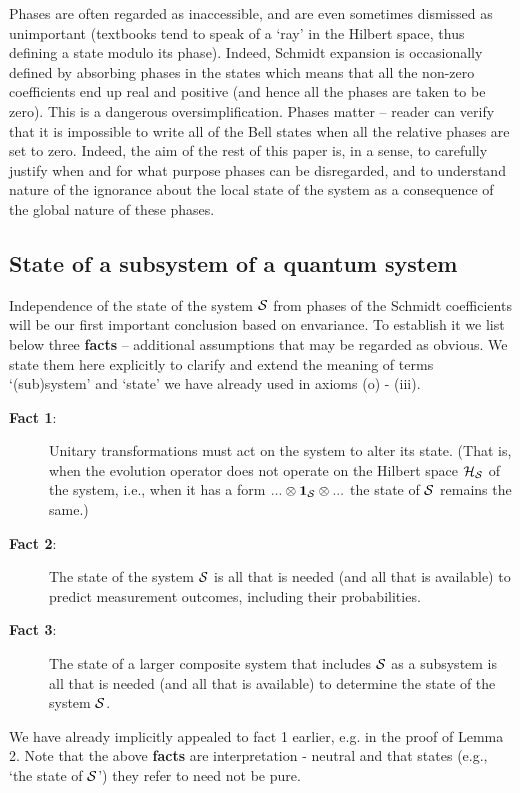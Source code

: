 \documentclass[aps,twocolumn,pra,epsfig]{revtex4}
\begin{document}
Phases are often regarded as inaccessible, and are even sometimes dismissed 
as unimportant (textbooks tend to speak of a `ray' in the Hilbert space, thus 
defining a state modulo its phase). Indeed, Schmidt expansion is occasionally 
defined by absorbing phases in the states which means that all the non-zero 
coefficients end up real and positive (and hence all the phases are taken to be zero).
This is a dangerous oversimplification. Phases matter -- reader can verify that 
it is impossible to write all of the Bell states when all the relative phases are set 
to zero. Indeed, the aim of the rest of this paper is, in a sense, to carefully justify
when and for what purpose phases can be disregarded, and to understand 
nature of the ignorance about the local state of the system as a consequence
of the global nature of these phases.  

\subsection{State of a subsystem of a quantum system}

Independence of the state of the system ${\cal S}$ from phases of
the Schmidt coefficients will be our first important conclusion based 
on envariance. To establish it we list below three {\bf facts} -- additional
assumptions that may be regarded as obvious.  We state them here
explicitly to clarify and extend the meaning of terms `(sub)system' and `state' 
we have already used in axioms (o) - (iii).
\begin{description}
\item[{\bf Fact 1}:] Unitary transformations must act on the system to alter
its state. (That is, when the evolution operator does not operate on the
Hilbert space ${\cal H_S}$ of the system, i.e., when it has a form $...\otimes
{\bf 1}_{\cal S} \otimes...$ the state of ${\cal S}$ remains the same.)
\item[{\bf Fact 2}:] The state of the system ${\cal S}$ is all that is needed
(and all that is available) to predict measurement outcomes, including their
probabilities.
\item[{\bf Fact 3}:] The state of a larger composite system that includes
${\cal S}$ as a subsystem is all that is needed (and all that is available)
to determine the state of the system ${\cal S}$.
\end{description}
\noindent We have already implicitly appealed to fact 1 earlier,
e.g. in the proof of Lemma 2. Note that the above {\bf facts} are interpretation
- neutral and that states (e.g., `the state of ${\cal S}$') they refer to need
not be pure.
\end{document}
